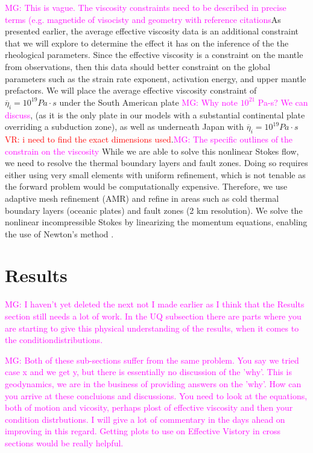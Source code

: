 \documentclass[12pt]{article}
\newcommand{\mgnote}[1]{\textcolor{magenta}{MG: #1}}
\newcommand{\vrnote}[1]{\textcolor{red}{VR: #1}}
\begin{document}
\mgnote{This is vague. The viscosity constraints need to be described in precise terms (e.g. magnetide of visocisty and geometry with reference citations}As presented earlier, the average effective viscosity data is an additional constraint that we will explore to determine the effect it has on the inference of the the rheological parameters. Since the effective viscosity is a constraint on the mantle from observations, then this data should better constraint on the global parameters such as the strain rate exponent, activation energy, and upper mantle prefactors. We will place the average effective viscosity constraint of $\overline{\eta}_i = 10^{19} Pa\cdot s$ under the South American plate \mgnote{Why note $10^21$ Pa-s? We can discuss}, (as it is the only plate in our models with a substantial continental plate overriding a subduction zone), as well as underneath Japan with $\overline{\eta}_i = 10^{19} Pa\cdot s$ \citep{hu2016asthenosphere} \vrnote{i need to find the exact dimensions used}.\mgnote{The specific outlines of the constrain on the viscosity}
 While we are able to solve this nonlinear Stokes flow, we need to resolve the thermal boundary layers and fault zones. Doing so requires either using very small elements with uniform refinement, which is not tenable as the forward problem would be computationally expensive. Therefore, we use adaptive mesh refinement (AMR) and refine in areas such as cold thermal boundary layers (oceanic plates) and fault zones (2 km resolution). 
We solve the nonlinear incompressible Stokes by linearizing the momentum equations, enabling the use of Newton's method \citep{rudi2015extreme}. 

\section{Results}

\mgnote{I haven't yet deleted the next not I made earlier as I think that the Results section still needs a lot of work. In the UQ subsection there are parts where you are starting to give this physical understanding of the results, when it comes to the conditiondistributions.}

\mgnote{Both of these sub-sections suffer from the same problem. You say we tried case x and we get y, but there is essentially no discussion of the 'why'. This is geodynamics, we are in the business of providing answers on the 'why'. How can you arrive at these concluions and discussions. You need to look at the equations, both of motion and  vicosity, perhaps plost of effective viscosity and then your condition distrbutions. I will give a lot of commentary in the days ahead on improving in this regard. Getting plots to use on Effective Vistory in cross sections would be really helpful.}
\end{document}

